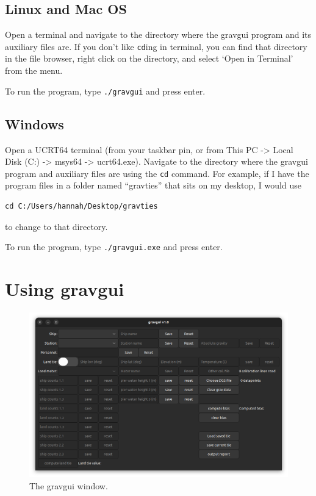 \documentclass{pfpe-manual}
\begin{document}
\subsection{Linux and Mac OS}
Open a terminal and navigate to the directory where the gravgui program and its auxiliary files are. If you don't like \texttt{cd}ing in terminal, you can find that directory in the file browser, right click on the directory, and select `Open in Terminal' from the menu.

To run the program, type \texttt{./gravgui} and press enter.

\subsection{Windows}
Open a UCRT64 terminal (from your taskbar pin, or from This PC -> Local Disk (C:) -> msys64 -> ucrt64.exe). Navigate to the directory where the gravgui program and auxiliary files are using the \texttt{cd} command. For example, if I have the program files in a folder named ``gravties'' that sits on my desktop, I would use
\begin{verbatim}
cd C:/Users/hannah/Desktop/gravties
\end{verbatim}
to change to that directory.

To run the program, type \texttt{./gravgui.exe} and press enter.

\section{Using gravgui}

\begin{figure}[ht!]
\centering
\includegraphics[width=\textwidth]{figs/gravgui_window_init.png}
\caption{The gravgui window.}
\label{fig:window}
\end{figure}
\end{document}
